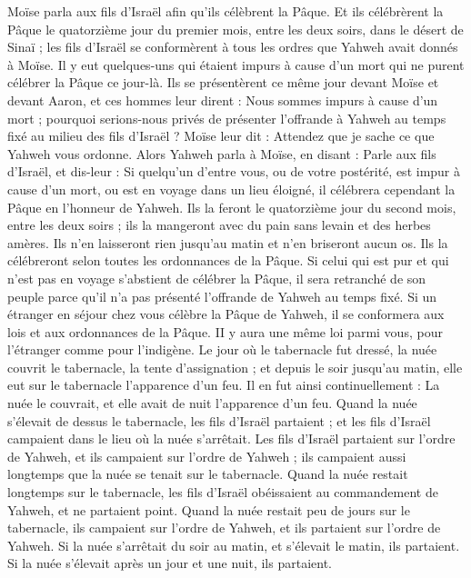 \begin{multicols}{2}
Moïse parla aux fils d'Israël afin qu'ils célèbrent la Pâque.
Et ils célébrèrent la Pâque le quatorzième jour du premier mois, entre les deux soirs, dans le désert de Sinaï ; les fils d'Israël se conformèrent à tous les ordres que Yahweh avait donnés à Moïse.
Il y eut quelques-uns qui étaient impurs à cause d’un mort qui ne purent célébrer la Pâque ce jour-là. Ils se présentèrent ce même jour devant Moïse et devant Aaron,
et ces hommes leur dirent : Nous sommes impurs à cause d’un mort ; pourquoi serions-nous privés de présenter l'offrande à Yahweh au temps fixé au milieu des fils d'Israël ?
Moïse leur dit : Attendez que je sache ce que Yahweh vous ordonne.
Alors Yahweh parla à Moïse, en disant :
Parle aux fils d'Israël, et dis-leur : Si quelqu'un d'entre vous, ou de votre postérité, est impur à cause d’un mort, ou est en voyage dans un lieu éloigné, il célébrera cependant la Pâque en l’honneur de Yahweh.
Ils la feront le quatorzième jour du second mois, entre les deux soirs ; ils la mangeront avec du pain sans levain et des herbes amères.
Ils n'en laisseront rien jusqu'au matin et n'en briseront aucun os. Ils la célébreront selon toutes les ordonnances de la Pâque.
Si celui qui est pur et qui n’est pas en voyage s’abstient de célébrer la Pâque, il sera retranché de son peuple parce qu'il n'a pas présenté l'offrande de Yahweh au temps fixé.
Si un étranger en séjour chez vous célèbre la Pâque de Yahweh, il se conformera aux lois et aux ordonnances de la Pâque. II y aura une même loi parmi vous, pour l'étranger comme pour l’indigène.
Le jour où le tabernacle fut dressé, la nuée couvrit le tabernacle, la tente d’assignation ; et depuis le soir jusqu’au matin, elle eut sur le tabernacle l’apparence d’un feu.
Il en fut ainsi continuellement : La nuée le couvrait, et elle avait de nuit l’apparence d’un feu.
Quand la nuée s’élevait de dessus le tabernacle, les fils d'Israël partaient ; et les fils d'Israël campaient dans le lieu où la nuée s'arrêtait.
Les fils d'Israël partaient sur l’ordre de Yahweh, et ils campaient sur l’ordre de Yahweh ; ils campaient aussi longtemps que la nuée se tenait sur le tabernacle.
Quand la nuée restait longtemps sur le tabernacle, les fils d'Israël obéissaient au commandement de Yahweh, et ne partaient point.
Quand la nuée restait peu de jours sur le tabernacle, ils campaient sur l’ordre de Yahweh, et ils partaient sur l’ordre de Yahweh.
Si la nuée s’arrêtait du soir au matin, et s’élevait le matin, ils partaient. Si la nuée s’élevait après un jour et une nuit, ils partaient.

\end{multicols}
